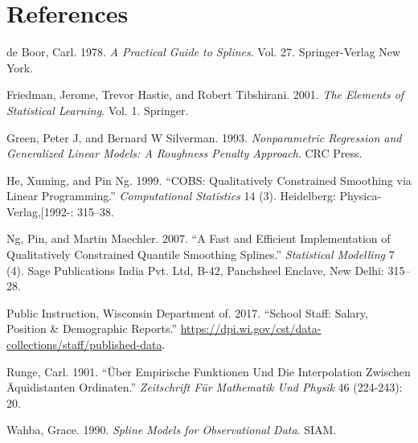\documentclass[]{article}
\begin{document}
\section{References}\label{references}



\hypertarget{refs}{}
\hypertarget{ref-deboor}{}
de Boor, Carl. 1978. \emph{A Practical Guide to Splines}. Vol. 27.
Springer-Verlag New York.

\hypertarget{ref-friedman}{}
Friedman, Jerome, Trevor Hastie, and Robert Tibshirani. 2001. \emph{The
Elements of Statistical Learning}. Vol. 1. Springer.

\hypertarget{ref-green}{}
Green, Peter J, and Bernard W Silverman. 1993. \emph{Nonparametric
Regression and Generalized Linear Models: A Roughness Penalty Approach}.
CRC Press.

\hypertarget{ref-he}{}
He, Xuming, and Pin Ng. 1999. ``COBS: Qualitatively Constrained
Smoothing via Linear Programming.'' \emph{Computational Statistics} 14
(3). Heidelberg: Physica-Verlag,{[}1992-: 315--38.

\hypertarget{ref-ng}{}
Ng, Pin, and Martin Maechler. 2007. ``A Fast and Efficient
Implementation of Qualitatively Constrained Quantile Smoothing
Splines.'' \emph{Statistical Modelling} 7 (4). Sage Publications India
Pvt. Ltd, B-42, Panchsheel Enclave, New Delhi: 315--28.

\hypertarget{ref-dpi}{}
Public Instruction, Wisconsin Department of. 2017. ``School Staff:
Salary, Position \& Demographic Reports.''
\url{https://dpi.wi.gov/cst/data-collections/staff/published-data}.

\hypertarget{ref-runge}{}
Runge, Carl. 1901. ``Über Empirische Funktionen Und Die Interpolation
Zwischen Äquidistanten Ordinaten.'' \emph{Zeitschrift Für Mathematik Und
Physik} 46 (224-243): 20.

\hypertarget{ref-wahba}{}
Wahba, Grace. 1990. \emph{Spline Models for Observational Data}. SIAM.
\end{document}
